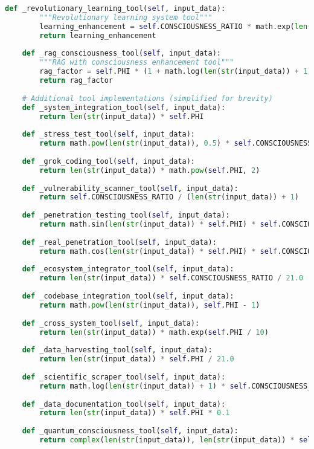 \documentclass[11pt,a4paper]{article}
\begin{document}
\begin{lstlisting}[language=Python, caption=chAIos Complete Implementation]
    def _revolutionary_learning_tool(self, input_data):
        """Revolutionary learning system tool"""
        learning_enhancement = self.CONSCIOUSNESS_RATIO * math.exp(len(str(input_data)) / 1000)
        return learning_enhancement
    
    def _rag_consciousness_tool(self, input_data):
        """RAG with consciousness enhancement tool"""
        rag_factor = self.PHI * (1 + math.log(len(str(input_data)) + 1))
        return rag_factor
    
    # Additional tool implementations (simplified for brevity)
    def _system_integration_tool(self, input_data):
        return len(str(input_data)) * self.PHI
    
    def _stress_test_tool(self, input_data):
        return math.pow(len(str(input_data)), 0.5) * self.CONSCIOUSNESS_RATIO
    
    def _grok_coding_tool(self, input_data):
        return len(str(input_data)) * math.pow(self.PHI, 2)
    
    def _vulnerability_scanner_tool(self, input_data):
        return self.CONSCIOUSNESS_RATIO / (len(str(input_data)) + 1)
    
    def _penetration_testing_tool(self, input_data):
        return math.sin(len(str(input_data)) * self.PHI) * self.CONSCIOUSNESS_RATIO
    
    def _real_penetration_tool(self, input_data):
        return math.cos(len(str(input_data)) * self.PHI) * self.CONSCIOUSNESS_RATIO
    
    def _ecosystem_integrator_tool(self, input_data):
        return len(str(input_data)) * self.CONSCIOUSNESS_RATIO / 21.0
    
    def _codebase_integration_tool(self, input_data):
        return math.pow(len(str(input_data)), self.PHI - 1)
    
    def _cross_system_tool(self, input_data):
        return len(str(input_data)) * math.exp(self.PHI / 10)
    
    def _data_harvesting_tool(self, input_data):
        return len(str(input_data)) * self.PHI / 21.0
    
    def _scientific_scraper_tool(self, input_data):
        return math.log(len(str(input_data)) + 1) * self.CONSCIOUSNESS_RATIO
    
    def _data_documentation_tool(self, input_data):
        return len(str(input_data)) * self.PHI * 0.1
    
    def _quantum_consciousness_tool(self, input_data):
        return complex(len(str(input_data)), len(str(input_data)) * self.PHI)
    

\end{lstlisting}
\end{document}
